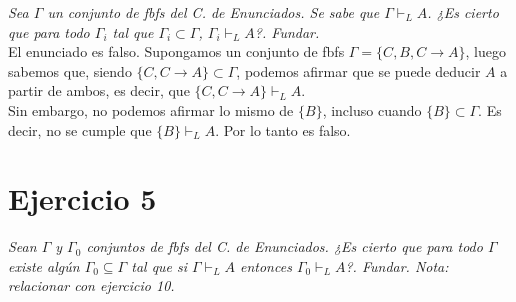 \documentclass[osajnl,twocolumn,showpacs,superscriptaddress,10pt,leqno]{revtex4-1} %
\begin{document}
\textit{Sea $\Gamma$ un conjunto de fbfs del C. de Enunciados. Se sabe que $\Gamma \vdash_L A$. ¿Es cierto que para todo $\Gamma_i$ tal que $\Gamma_i \subset \Gamma$, $\Gamma_i \vdash_L A$?. Fundar.} \\

El enunciado es falso. Supongamos un conjunto de fbfs $\Gamma = \{ C, B, C \rightarrow A \}$,
luego sabemos que, siendo $\{ C, C \rightarrow A \} \subset \Gamma$, podemos afirmar que se puede deducir
$A$ a partir de ambos, es decir, que $\{ C, C \rightarrow A \} \vdash_L A$. \\

Sin embargo, no podemos afirmar lo mismo de $\{ B \}$, incluso cuando $\{ B \} \subset \Gamma$. Es decir,
no se cumple que $\{ B \} \vdash_L A$. Por lo tanto es falso.

\section{Ejercicio 5}

\textit{Sean $\Gamma$ y $\Gamma_0$ conjuntos de fbfs del C. de Enunciados. ¿Es cierto que para todo $\Gamma$ existe algún $\Gamma_0 \subseteq \Gamma$ tal que si $\Gamma \vdash_L A$ entonces $\Gamma_0 \vdash_L A$?. Fundar. Nota: relacionar con ejercicio 10.} \\
\end{document}
